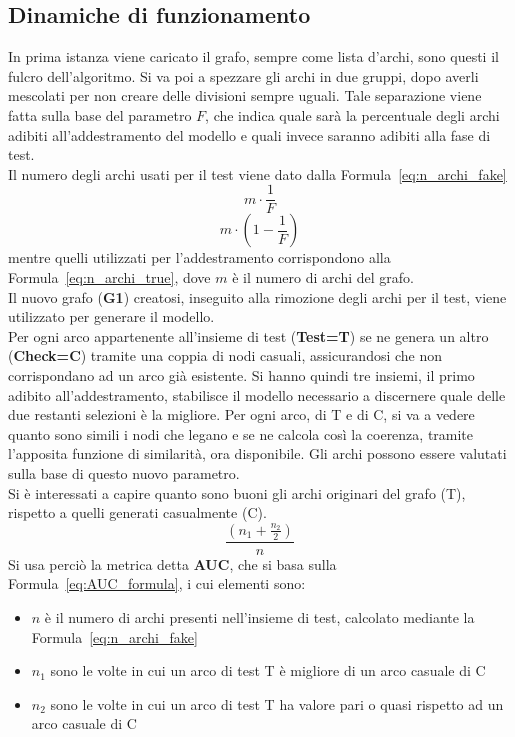 \subsection{Dinamiche di funzionamento}
In prima istanza viene caricato il grafo, sempre come lista d'archi, sono questi il fulcro dell'algoritmo. Si va poi a spezzare gli archi in due gruppi, dopo averli mescolati per non creare delle divisioni sempre uguali. Tale separazione viene fatta sulla base del parametro $F$, che indica quale sarà la percentuale degli archi adibiti all'addestramento del modello e quali invece saranno adibiti alla fase di test.\\
Il numero degli archi usati per il test viene dato dalla Formula~\ref{eq:n_archi_fake}
\begin{equation}
	m \cdot \frac{1}{F}
	\label{eq:n_archi_fake}
\end{equation} 
\begin{equation}
	m \cdot \left( 1- \frac{1}{F} \right)
	\label{eq:n_archi_true}
\end{equation}
mentre quelli utilizzati per l'addestramento corrispondono alla Formula~\ref{eq:n_archi_true}, dove $m$ è il numero di archi del grafo.\\
Il nuovo grafo (\textbf{G1}) creatosi, inseguito alla rimozione degli archi per il test, viene utilizzato per generare il modello.\\
Per ogni arco appartenente all'insieme di test (\textbf{Test=T}) se ne genera un altro (\textbf{Check=C}) tramite una coppia di nodi casuali, assicurandosi che non corrispondano ad un arco già esistente. Si hanno quindi tre insiemi, il primo adibito all'addestramento, stabilisce il modello necessario a discernere quale delle due restanti selezioni è la migliore.
Per ogni arco, di T e di C, si va a vedere quanto sono simili i nodi che legano e se ne calcola così la coerenza, tramite l'apposita funzione di similarità, ora disponibile. Gli archi possono essere valutati sulla base di questo nuovo parametro.\\
Si è interessati a capire quanto sono buoni gli archi originari del grafo (T), rispetto a quelli generati casualmente (C). 
\begin{equation}
	\frac{\left( n_1 + \frac{n_2}{2} \right)}{n}
	\label{eq:AUC_formula}
\end{equation}
Si usa perciò la metrica detta \textbf{AUC}\cite{AUC_metric}, che si basa sulla Formula~\ref{eq:AUC_formula}, i cui elementi sono:
\begin{itemize}
	\item $n$ è il numero di archi presenti nell'insieme di test, calcolato mediante la Formula~\ref{eq:n_archi_fake}
	\item $n_1$ sono le volte in cui un arco di test T è migliore di un arco casuale di C
	\item $n_2$ sono le volte in cui un arco di test T ha valore pari o quasi rispetto ad un arco casuale di C
\end{itemize}
